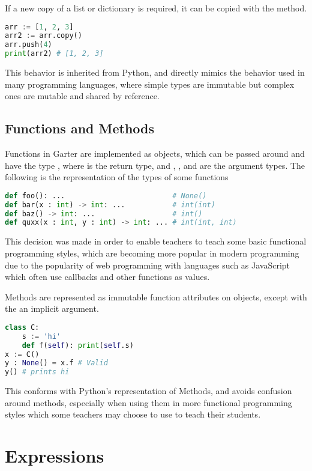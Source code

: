 If a new copy of a list or dictionary is required, it can be copied with
the  method.

\begin{lstlisting}[language=Python]
arr := [1, 2, 3]
arr2 := arr.copy()
arr.push(4)
print(arr2) # [1, 2, 3]
\end{lstlisting}

This behavior is inherited from Python, and directly mimics the behavior used in
many programming languages, where simple types are immutable but complex ones
are mutable and shared by reference.

\subsection{Functions and Methods}

Functions in Garter are implemented as objects, which can be passed around and
have the type , where  is the return type, and
, , and  are the argument types. The following is the
representation of the types of some functions

\begin{lstlisting}[language=Python]
def foo(): ...                         # None()
def bar(x : int) -> int: ...           # int(int)
def baz() -> int: ...                  # int()
def quxx(x : int, y : int) -> int: ... # int(int, int)
\end{lstlisting}

This decision was made in order to enable teachers to teach some basic
functional programming styles, which are becoming more popular in modern
programming due to the popularity of web programming with languages such as
JavaScript which often use callbacks and other functions as values.

Methods are represented as immutable function attributes on objects, except with
the an implicit  argument.

\begin{lstlisting}[language=Python]
class C:
    s := 'hi'
    def f(self): print(self.s)
x := C()
y : None() = x.f # Valid
y() # prints hi
\end{lstlisting}

This conforms with Python's representation of Methods, and avoids confusion
around methods, especially when using them in more functional programming styles
which some teachers may choose to use to teach their students.

\section{Expressions}

